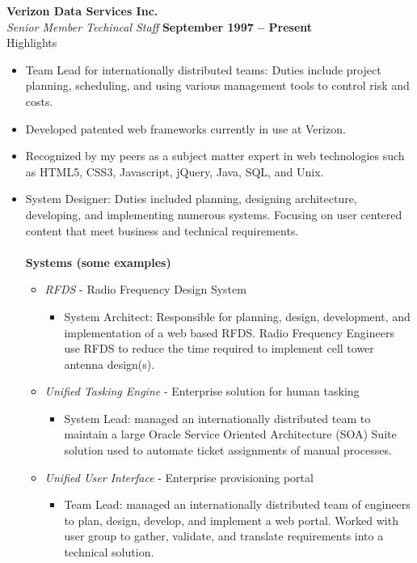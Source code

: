 \documentclass[margin,line]{resume}
\begin{document}
\begin{resume}
    \textbf{\listing Verizon Data Services Inc.} \vspace{2mm}\\\vspace{1mm}%
    \textsl{Senior Member Techincal Staff} \hfill \textbf{September 1997 -- Present}\\
    \textsf{\textmd{Highlights}}\\
    \begin{itemize}
      \item Team Lead for internationally distributed teams: Duties include project planning, scheduling, and using various management tools to control risk and costs.
      \item Developed patented web frameworks currently in use at Verizon.
      \item Recognized by my peers as a subject matter expert in web technologies such as HTML5, CSS3, Javascript, jQuery, Java, SQL, and Unix.
    \item System Designer: Duties included planning, designing architecture, developing, and implementing numerous systems. Focusing on user centered content that meet business and technical requirements.\\\\
      \textbf{Systems \textmd{(some examples)}}
      \begin{itemize}
      \item \textsl{RFDS} - Radio Frequency Design System
      \begin{itemize}
          \item System Architect: Responsible for planning, design, development, and implementation of a web based RFDS. Radio Frequency Engineers use RFDS to reduce the time required to implement cell tower antenna design(s). 
      \end{itemize}
      \item \textsl{Unified Tasking Engine} - Enterprise solution for human tasking
      \begin{itemize}
          \item System Lead: managed an internationally distributed team to maintain a large Oracle Service Oriented Architecture (SOA) Suite solution used to automate ticket assignments of manual processes.
      \end{itemize}
      \item \textsl{Unified User Interface} - Enterprise provisioning portal
      \begin{itemize}
          \item Team Lead: managed an internationally distributed team of engineers to plan, design, develop, and implement a web portal. Worked with user group to gather, validate, and translate requirements into a technical solution.

\end{itemize}
\end{itemize}
\end{itemize}
\end{resume}
\end{document}
